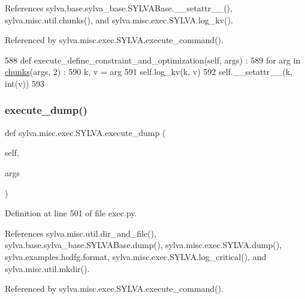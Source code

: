 References sylva.\+base.\+sylva\+\_\+base.\+S\+Y\+L\+V\+A\+Base.\+\_\+\+\_\+setattr\+\_\+\+\_\+(), sylva.\+misc.\+util.\+chunks(), and sylva.\+misc.\+exec.\+S\+Y\+L\+V\+A.\+log\+\_\+kv().



Referenced by sylva.\+misc.\+exec.\+S\+Y\+L\+V\+A.\+execute\+\_\+command().


\begin{DoxyCode}
588   \textcolor{keyword}{def }execute\_define\_constraint\_and\_optimization(self, args) :
589     \textcolor{keywordflow}{for} arg \textcolor{keywordflow}{in} \hyperlink{namespacesylva_1_1misc_1_1util_aa202ba520fb5e2daa064c4379aeeb5cf}{chunks}(args, 2) :
590       k, v = arg
591       self.log\_kv(k, v)
592       self.\_\_setattr\_\_(k, int(v))
593 
\end{DoxyCode}
\mbox{\label{classsylva_1_1misc_1_1exec_1_1_s_y_l_v_a_a1e3a1bd5990d4d39571805075e3103ba}} 
\subsubsection{\texorpdfstring{execute\+\_\+dump()}{execute\_dump()}}
{\footnotesize\ttfamily def sylva.\+misc.\+exec.\+S\+Y\+L\+V\+A.\+execute\+\_\+dump (\begin{DoxyParamCaption}\item[{}]{self,  }\item[{}]{args }\end{DoxyParamCaption})}



Definition at line 501 of file exec.\+py.



References sylva.\+misc.\+util.\+dir\+\_\+and\+\_\+file(), sylva.\+base.\+sylva\+\_\+base.\+S\+Y\+L\+V\+A\+Base.\+dump(), sylva.\+misc.\+exec.\+S\+Y\+L\+V\+A.\+dump(), sylva.\+examples.\+hsdfg.\+format, sylva.\+misc.\+exec.\+S\+Y\+L\+V\+A.\+log\+\_\+critical(), and sylva.\+misc.\+util.\+mkdir().



Referenced by sylva.\+misc.\+exec.\+S\+Y\+L\+V\+A.\+execute\+\_\+command().


